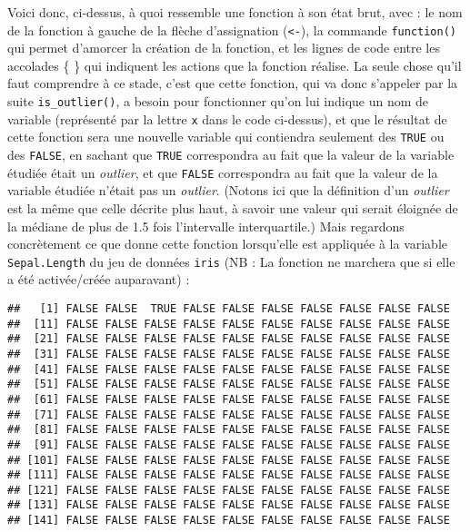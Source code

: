 \documentclass[
  french,
]{book}
\newenvironment{Shaded}{\begin{snugshade}}{\end{snugshade}}
\newcommand{\DataTypeTok}[1]{\textcolor[rgb]{0.13,0.29,0.53}{#1}}
\newcommand{\KeywordTok}[1]{\textcolor[rgb]{0.13,0.29,0.53}{\textbf{#1}}}
\newcommand{\NormalTok}[1]{#1}
\newcommand{\OperatorTok}[1]{\textcolor[rgb]{0.81,0.36,0.00}{\textbf{#1}}}
\begin{document}
Voici donc, ci-dessus, à quoi ressemble une fonction à son état brut, avec : le nom de la fonction à gauche de la flèche d'assignation (\texttt{\textless{}-}), la commande \texttt{function()} qui permet d'amorcer la création de la fonction, et les lignes de code entre les accolades \{ \} qui indiquent les actions que la fonction réalise. La seule chose qu'il faut comprendre à ce stade, c'est que cette fonction, qui va donc s'appeler par la suite \texttt{is\_outlier()}, a besoin pour fonctionner qu'on lui indique un nom de variable (représenté par la lettre \texttt{x} dans le code ci-dessus), et que le résultat de cette fonction sera une nouvelle variable qui contiendra seulement des \texttt{TRUE} ou des \texttt{FALSE}, en sachant que \texttt{TRUE} correspondra au fait que la valeur de la variable étudiée était un \emph{outlier}, et que \texttt{FALSE} correspondra au fait que la valeur de la variable étudiée n'était pas un \emph{outlier}. (Notons ici que la définition d'un \emph{outlier} est la même que celle décrite plus haut, à savoir une valeur qui serait éloignée de la médiane de plus de 1.5 fois l'intervalle interquartile.) Mais regardons concrètement ce que donne cette fonction lorsqu'elle est appliquée à la variable \texttt{Sepal.Length} du jeu de données \texttt{iris} (NB : La fonction ne marchera que si elle a été activée/créée auparavant) :

\begin{Shaded}
\end{Shaded}

\begin{verbatim}
##   [1] FALSE FALSE  TRUE FALSE FALSE FALSE FALSE FALSE FALSE FALSE
##  [11] FALSE FALSE FALSE FALSE FALSE FALSE FALSE FALSE FALSE FALSE
##  [21] FALSE FALSE FALSE FALSE FALSE FALSE FALSE FALSE FALSE FALSE
##  [31] FALSE FALSE FALSE FALSE FALSE FALSE FALSE FALSE FALSE FALSE
##  [41] FALSE FALSE FALSE FALSE FALSE FALSE FALSE FALSE FALSE FALSE
##  [51] FALSE FALSE FALSE FALSE FALSE FALSE FALSE FALSE FALSE FALSE
##  [61] FALSE FALSE FALSE FALSE FALSE FALSE FALSE FALSE FALSE FALSE
##  [71] FALSE FALSE FALSE FALSE FALSE FALSE FALSE FALSE FALSE FALSE
##  [81] FALSE FALSE FALSE FALSE FALSE FALSE FALSE FALSE FALSE FALSE
##  [91] FALSE FALSE FALSE FALSE FALSE FALSE FALSE FALSE FALSE FALSE
## [101] FALSE FALSE FALSE FALSE FALSE FALSE FALSE FALSE FALSE FALSE
## [111] FALSE FALSE FALSE FALSE FALSE FALSE FALSE FALSE FALSE FALSE
## [121] FALSE FALSE FALSE FALSE FALSE FALSE FALSE FALSE FALSE FALSE
## [131] FALSE FALSE FALSE FALSE FALSE FALSE FALSE FALSE FALSE FALSE
## [141] FALSE FALSE FALSE FALSE FALSE FALSE FALSE FALSE FALSE FALSE
\end{verbatim}
\end{document}
